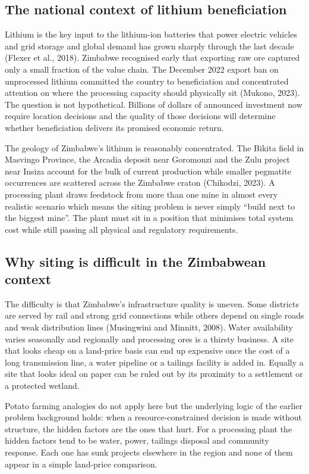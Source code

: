 \documentclass[12pt,a4paper]{report}
\begin{document}
\subsection{The national context of lithium beneficiation}
Lithium is the key input to the lithium-ion batteries that power
electric vehicles and grid storage and global demand has grown sharply
through the last decade (Flexer et al., 2018). Zimbabwe recognised
early that exporting raw ore captured only a small fraction of the
value chain. The December 2022 export ban on unprocessed lithium
committed the country to beneficiation and concentrated attention on
where the processing capacity should physically sit (Mukono, 2023). The
question is not hypothetical. Billions of dollars of announced
investment now require location decisions and the quality of those
decisions will determine whether beneficiation delivers its promised
economic return.

The geology of Zimbabwe's lithium is reasonably concentrated. The
Bikita field in Masvingo Province, the Arcadia deposit near Goromonzi
and the Zulu project near Insiza account for the bulk of current
production while smaller pegmatite occurrences are scattered across
the Zimbabwe craton (Chikodzi, 2023). A processing plant draws
feedstock from more than one mine in almost every realistic scenario
which means the siting problem is never simply ``build next to the
biggest mine''. The plant must sit in a position that minimises total
system cost while still passing all physical and regulatory
requirements.

\subsection{Why siting is difficult in the Zimbabwean context}
The difficulty is that Zimbabwe's infrastructure quality is uneven.
Some districts are served by rail and strong grid connections while
others depend on single roads and weak distribution lines (Musingwini
and Minnitt, 2008). Water availability varies seasonally and
regionally and processing ores is a thirsty business. A site that
looks cheap on a land-price basis can end up expensive once the cost
of a long transmission line, a water pipeline or a tailings facility
is added in. Equally a site that looks ideal on paper can be ruled out
by its proximity to a settlement or a protected wetland.

Potato farming analogies do not apply here but the underlying logic of
the earlier problem background holds: when a resource-constrained
decision is made without structure, the hidden factors are the ones
that hurt. For a processing plant the hidden factors tend to be water,
power, tailings disposal and community response. Each one has sunk
projects elsewhere in the region and none of them appear in a simple
land-price comparison.
\end{document}
